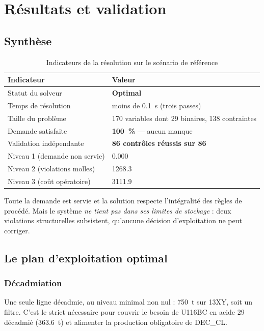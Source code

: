 \chapter{Résultats et validation}
\label{chap:resultats}

\section{Synthèse}

\begin{table}[H]
\centering
\caption{Indicateurs de la résolution sur le scénario de référence}
\label{tab:synthese-resultats}
\begin{tabular}{@{}ll@{}}
\toprule
\textbf{Indicateur} & \textbf{Valeur} \\
\midrule
Statut du solveur & \textbf{Optimal} \\
Temps de résolution & moins de \SI{0.1}{\second} (trois passes) \\
Taille du problème & 170 variables dont 29 binaires, 138 contraintes \\
Demande satisfaite & \textbf{\SI{100}{\percent}} --- aucun manque \\
Validation indépendante & \textbf{86 contrôles réussis sur 86} \\
Niveau 1 (demande non servie) & \num{0,000} \\
Niveau 2 (violations molles) & \num{1268,3} \\
Niveau 3 (coût opératoire) & \num{3111,9} \\
\bottomrule
\end{tabular}
\end{table}

Toute la demande est servie et la solution respecte l'intégralité des règles de procédé.
Mais le système \emph{ne tient pas dans ses limites de stockage} : deux violations
structurelles subsistent, qu'aucune décision d'exploitation ne peut corriger.

\section{Le plan d'exploitation optimal}

\subsection{Décadmiation}

Une seule ligne décadmie, au niveau minimal non nul : \SI{750}{\tonne} sur 13XY, soit un
filtre. C'est le strict nécessaire pour couvrir le besoin de U116BC en acide 29 décadmié
(\SI{363,6}{\tonne}) et alimenter la production obligatoire de DEC\_CL.

